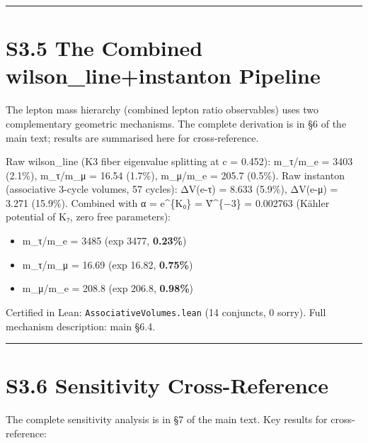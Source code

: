 \documentclass[11pt,a4paper]{article}
\begin{document}
\begin{center}\rule{\linewidth}{0.5pt}\end{center}

\section{S3.5 The Combined wilson\_\allowbreak{}line+instanton Pipeline}\label{s3.5-the-combined-wilson_lineinstanton-pipeline}

The lepton mass hierarchy (combined lepton ratio observables) uses two complementary geometric mechanisms. The complete derivation is in §6 of the main text; results are summarised here for cross-reference.

Raw wilson\_\allowbreak{}line (K3 fiber eigenvalue splitting at c = 0.452): m\_\allowbreak{}τ/m\_\allowbreak{}e = 3403 (2.1\%), m\_\allowbreak{}τ/m\_\allowbreak{}μ = 16.54 (1.7\%), m\_\allowbreak{}μ/m\_\allowbreak{}e = 205.7 (0.5\%). Raw instanton (associative 3-cycle volumes, 57 cycles): ΔV(e-τ) = 8.633 (5.9\%), ΔV(e-μ) = 3.271 (15.9\%). Combined with α = e\^{}\{K₀\} = V̂\^{}\{−3\} = 0.002763 (Kähler potential of K₇, zero free parameters):

\begin{itemize}
\tightlist
\item
  m\_\allowbreak{}τ/m\_\allowbreak{}e = 3485 (exp 3477, \textbf{0.23\%})
\item
  m\_\allowbreak{}τ/m\_\allowbreak{}μ = 16.69 (exp 16.82, \textbf{0.75\%})
\item
  m\_\allowbreak{}μ/m\_\allowbreak{}e = 208.8 (exp 206.8, \textbf{0.98\%})
\end{itemize}

Certified in Lean: \texttt{Associative\allowbreak{}Volumes.\allowbreak{}lean} (14 conjuncts, 0 sorry). Full mechanism description: main §6.4.

\begin{center}\rule{\linewidth}{0.5pt}\end{center}

\section{S3.6 Sensitivity Cross-Reference}\label{s3.6-sensitivity-cross-reference}

The complete sensitivity analysis is in §7 of the main text. Key results for cross-reference:
\end{document}
